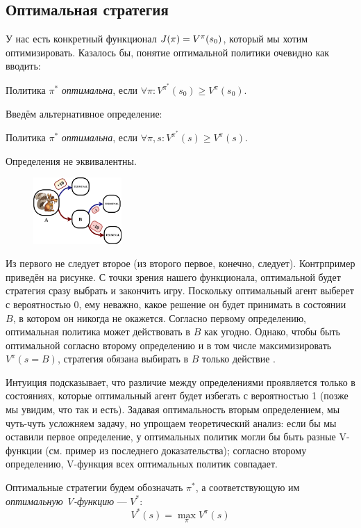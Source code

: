 \subsection{Оптимальная стратегия}

У нас есть конкретный функционал $J(\pi) \HM= V^{\pi}(s_0)$, который мы хотим оптимизировать. Казалось бы, понятие оптимальной политики очевидно как вводить:
\begin{definition} 
Политика $\pi^*$ \emph{оптимальна}, если $\forall \pi \colon V^{\pi^*}(s_0) \ge V^\pi(s_0)$.
\end{definition}

Введём альтернативное определение:

\begin{definition} 
Политика $\pi^*$ \emph{оптимальна}, если $\forall \pi, s \colon V^{\pi^*}(s) \ge V^\pi(s)$.
\end{definition}

\begin{theorem}
Определения не эквивалентны.

\begin{figure}
\centering
\includegraphics[width=0.3\textwidth]{Images/OptDefEq.png}
\end{figure}
\beginproof{}
Из первого не следует второе (из второго первое, конечно, следует). Контрпример приведён на рисунке. С точки зрения нашего функционала, оптимальной будет стратегия сразу выбрать  и закончить игру. Поскольку оптимальный агент выберет  с вероятностью 0, ему неважно, какое решение он будет принимать в состоянии $B$, в котором он никогда не окажется. Согласно первому определению, оптимальная политика может действовать в $B$ как угодно. Однако, чтобы быть оптимальной согласно второму определению и в том числе максимизировать $V^\pi(s = B)$, стратегия обязана выбирать в $B$ только действие . \QED
\end{theorem}

Интуиция подсказывает, что различие между определениями проявляется только в состояниях, которые оптимальный агент будет избегать с вероятностью 1 (позже мы увидим, что так и есть). Задавая оптимальность вторым определением, мы чуть-чуть усложняем задачу, но упрощаем теоретический анализ: если бы мы оставили первое определение, у оптимальных политик могли бы быть разные V-функции (см. пример из последнего доказательства); согласно второму определению, V-функция всех оптимальных политик совпадает. 
\begin{definition}
Оптимальные стратегии будем обозначать $\pi^*$, а соответствующую им \emph{оптимальную V-функцию} --- $V^*$:
\begin{equation}\label{optimalVdefinition}
V^*(s) = \max_\pi V^{\pi}(s)
\end{equation}
\end{definition}

